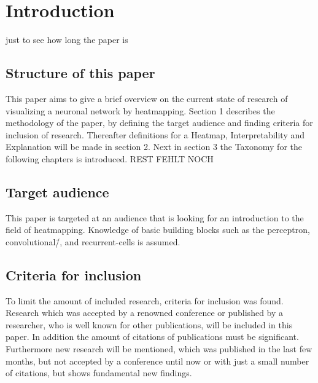 \section{Introduction}
just to see how long the paper is

\subsection{Structure of this paper}
This paper aims to give a brief overview on the current state of research of visualizing a neuronal network by heatmapping. Section 1 describes the methodology of the paper, by defining the target audience and finding criteria for inclusion of research.
Thereafter definitions for a Heatmap, Interpretability and Explanation will be made in section 2. Next in section 3 the Taxonomy for the following chapters is introduced. REST FEHLT NOCH


\subsection{Target audience}
This paper is targeted at an audience that is looking for an introduction to 
the field of heatmapping. Knowledge of basic building blocks such as the 
perceptron, convolutional\=/, and recurrent-cells is assumed.

\subsection{Criteria for inclusion}
To limit the amount of included research, criteria for inclusion was found. Research which was accepted by a renowned conference or published by a researcher, who is well known for other publications, will be included in this paper. In addition the amount of citations of publications must be significant. Furthermore new research will be mentioned, which was published in the last few months, but not accepted by a conference until now or with just a small number of citations, but shows fundamental new findings.
